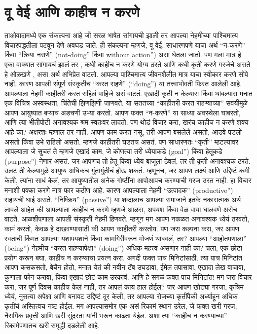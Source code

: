  \chapter{वू वेई आणि काहीच न करणे}
ताओवादामध्ये एक संकल्पना आहे जी सरळ भाषेत सांगायची झाली तर आपल्या नेहमीच्या पाश्चिमात्य विचारपद्धतीला पटवून देणे अवघड जाते. ही संकल्पना म्हणजे, वू वेई. साधारणपणे याचा अर्थ “न-करणे” किंवा “क्रिया नसणे” (not-doing'' किंवा without action'') असा घेतला जातो. पण मला मात्र हे एका वाक्यात सांगायचं झालं तर ,  कधी काहीच न करणे योग्य ठरते आणि कधी कृती करणे गरजेचे असते हे ओळखणे ,  असा अर्थ अभिप्रेत वाटतो.
आपल्या पाश्चिमात्य जीवनशैलीत मात्र याचा स्वीकार करणे सोपे नाही. कारण आपली संपूर्ण संस्कृतीच “करत राहणे” (``doing'') या तत्त्वाभोवती फिरत आलेली आहे. आपल्याला नेहमी काहीतरी करत राहिलं पाहिजे असं वाटतं. एखादी कृती न केल्यास किंवा थांबल्यास मनात एक विचित्र अस्वस्थता, चिंतेची झिणझिणी जाणवते. या सततच्या “काहीतरी करत राहण्याच्या” सवयीमुळे आपण आयुष्यात बऱ्याच अडचणी उभ्या करतो. आपण फक्त “न-करणे” या साध्या अवस्थेला घाबरतो, आणि त्या भीतीपोटी अनावश्यक श्रम स्वतःवर लादतो.
पण थोडं विचार करा, खरंच काहीच न करणे शक्य आहे का? अक्षरशः म्हणाल तर नाही. आपण काम करत नसू, तरी आपण बसलेले असतो, आडवे पडलो असतो किंवा उभे राहिलो असतो. म्हणजे काहीतरी घडतच असतं. पण साधारणतः “कृती” म्हटल्यावर आपल्याला जे सुचतं ते म्हणजे एखादं काम, जे कोणत्या तरी ध्येयाकडे (goal'') किंवा हेतूकडे (purpose'') नेणारं असतं. जर आपणच तो हेतू किंवा ध्येय बाजूला ठेवलं, तर ती कृती अनावश्यक ठरते. उलट ती केल्यामुळे आयुष्य अधिकच गुंतागुंतीचं होऊ शकतं.
म्हणूनच, जर आपण लक्ष्यं आणि उद्दिष्टं कमी केली, त्यांना साधं केलं, तर आयुष्यातील अनेक गोष्टींना आपोआपच करण्याची गरज उरत नाही.
हा विचार मनाशी पक्का करणे मात्र फार कठीण आहे. कारण आपल्याला नेहमी “उत्पादक” (productive'') राहायची घाई असते. “निष्क्रिय” (passive'') या शब्दालाच आपल्या समाजाने इतके नकारात्मक अर्थ लावले आहेत की आपल्याला काहीच न करणे म्हणजे आळस, अपयश किंवा वेळ वाया घालवणे असेच वाटते. आळशीपणाला आपली संस्कृती नेहमी हिणवते. म्हणून मग आपण नकळत अनावश्यक ध्येयं ठरवतो, कामं करतो, केवळ हे दाखवण्यासाठी की आपण काहीतरी करतोय.
पण जरा कल्पना करा, जर आपण स्वतःची किंमत आपल्या यशापयशाने किंवा कामगिरीवरून मोजणं थांबवलं, तर? आपल्या “आहोतपणाला” (being'') नेहमीच “करत राहण्यापेक्षा” (doing'') अधिक महत्त्व असणार नाही का?
चला, एक छोटा प्रयोग करून बघा. काहीच न करण्याचा प्रयत्न करा. अगदी फक्त पाच मिनिटांसाठी. त्या पाच मिनिटांत आपण कसकसतो, बेचैन होतो, मनात येतं की नवीन टॅब उघडावा, ईमेल तपासावा, एखादा लेख वाचावा, कुणाला फोन करावा, किंवा एखादं छोटं काम उरकावं. आणि हे सगळं फक्त पाच मिनिटांत! मग जरा विचार करा, जर पूर्ण दिवस काहीच केलं नाही, तर आपलं काय हाल होईल?
जर आपण खोट्या गरजा, कृत्रिम ध्येयं, नुसत्या अपेक्षा आणि बनावट उद्दिष्टं दूर केली, तर आपल्या रोजच्या कृतींपैकी अर्ध्याहून अधिक कृतींचं अस्तित्वच नष्ट होईल. मग आपल्यासमोर एक असं रिकामं स्थान उरेल, जे फक्त खरी गरज, नैसर्गिक प्रवृत्ती आणि खरी सुंदरता यांनी भरून काढता येईल.
अशा त्या “काहीच न करण्याच्या” रिकामेपणातच खरी समृद्धी दडलेली आहे.
